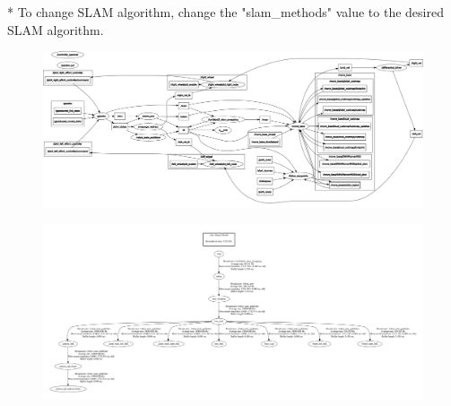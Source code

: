 \documentclass[12]{article}
\begin{document}
  * To change SLAM algorithm, change the "slam\_methods" value to the desired SLAM algorithm.
  

\begin{landscape}
\newpage
\begin{figure}
    \centering
    \includegraphics[width=\columnwidth]{images/rosgraph.png}
\end{figure}
\end{landscape}
\begin{landscape}
\newpage
\begin{figure}
    \centering
    \includegraphics[width=\columnwidth]{images/frames-1.png}
\end{figure}

\end{landscape}
\newpage
\end{document}
